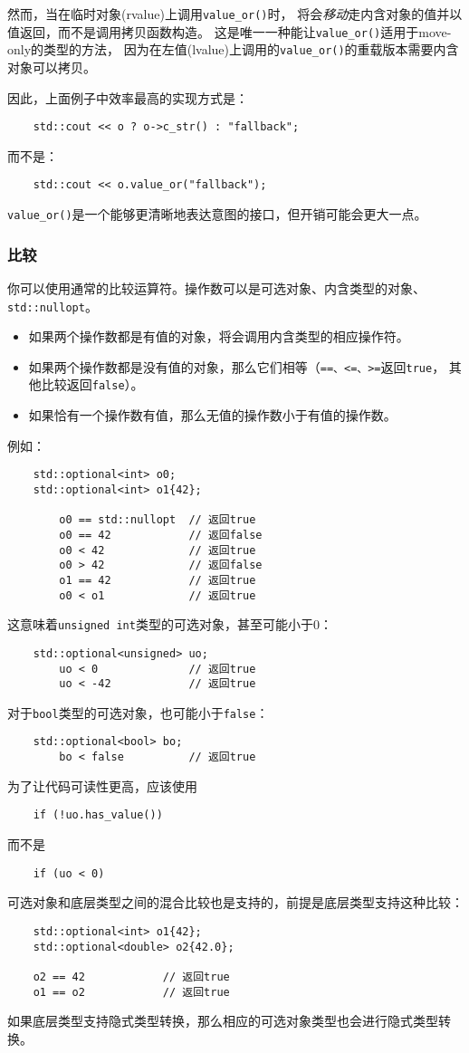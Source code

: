 然而，当在临时对象(rvalue)上调用\texttt{value\_or()}时，
将会\emph{移动}走内含对象的值并以值返回，而不是调用拷贝函数构造。
这是唯一一种能让\texttt{value\_or()}适用于move-only的类型的方法，
因为在左值(lvalue)上调用的\texttt{value\_or()}的重载版本需要内含对象可以拷贝。

因此，上面例子中效率最高的实现方式是：
\begin{lstlisting}
    std::cout << o ? o->c_str() : "fallback";
\end{lstlisting}
而不是：
\begin{lstlisting}
    std::cout << o.value_or("fallback");
\end{lstlisting}
\texttt{value\_or()}是一个能够更清晰地表达意图的接口，但开销可能会更大一点。

\subsubsection{比较}
你可以使用通常的比较运算符。操作数可以是可选对象、内含类型的对象、\texttt{std::nullopt}。
\begin{itemize}
    \item 如果两个操作数都是有值的对象，将会调用内含类型的相应操作符。
    \item 如果两个操作数都是没有值的对象，那么它们相等（\texttt{==、<=、>=}返回\texttt{true}，
    其他比较返回\texttt{false}）。
    \item 如果恰有一个操作数有值，那么无值的操作数小于有值的操作数。
\end{itemize}
例如：
\begin{lstlisting}
    std::optional<int> o0;
    std::optional<int> o1{42};

        o0 == std::nullopt  // 返回true
        o0 == 42            // 返回false
        o0 < 42             // 返回true
        o0 > 42             // 返回false
        o1 == 42            // 返回true
        o0 < o1             // 返回true
\end{lstlisting}
这意味着\texttt{unsigned int}类型的可选对象，甚至可能小于0：
\begin{lstlisting}
    std::optional<unsigned> uo;
        uo < 0              // 返回true
        uo < -42            // 返回true
\end{lstlisting}
对于\texttt{bool}类型的可选对象，也可能小于\texttt{false}：
\begin{lstlisting}
    std::optional<bool> bo;
        bo < false          // 返回true
\end{lstlisting}
为了让代码可读性更高，应该使用
\begin{lstlisting}
    if (!uo.has_value())
\end{lstlisting}
而不是
\begin{lstlisting}
    if (uo < 0)
\end{lstlisting}
可选对象和底层类型之间的混合比较也是支持的，前提是底层类型支持这种比较：
\begin{lstlisting}
    std::optional<int> o1{42};
    std::optional<double> o2{42.0};

    o2 == 42            // 返回true
    o1 == o2            // 返回true
\end{lstlisting}
如果底层类型支持隐式类型转换，那么相应的可选对象类型也会进行隐式类型转换。

